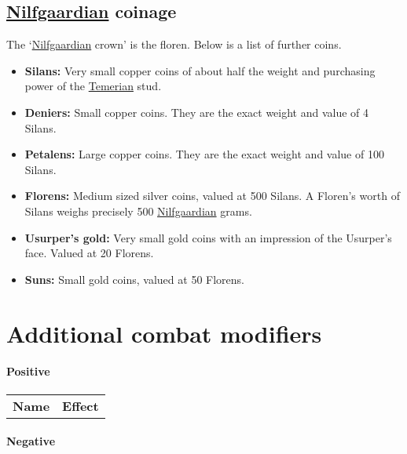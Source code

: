 \documentclass[parskip=full,11pt,%
footheight=38pt]{scrreport}
\begin{document}
\section{\hyperref[realm:nilfgaard]{Nilfgaardian} coinage}
The `\hyperref[realm:nilfgaard]{Nilfgaardian} crown' is the floren. Below is a list of further coins.

\begin{itemize}
	\item \textbf{Silans:} Very small copper coins of about half the weight and purchasing power of the \hyperref[realm:temeria]{Temerian}
	      stud.
	\item \textbf{Deniers:} Small copper coins. They are the exact weight and value of 4 Silans.
	\item \textbf{Petalens:} Large copper coins. They are the exact weight and value of 100 Silans.
	\item \textbf{Florens:} Medium sized silver coins, valued at 500 Silans. A Floren's worth of Silans weighs
	      precisely 500 \hyperref[realm:nilfgaard]{Nilfgaardian} grams.
	\item \textbf{Usurper's gold:} Very small gold coins with an impression of the Usurper's face. Valued at 20 Florens.
	\item \textbf{Suns:} Small gold coins, valued at 50 Florens.
\end{itemize}

\chapter{Additional combat modifiers}

\large

\subsubsection*{Positive}

\begin{tabularx}{\textwidth}{cX}
	\rowcolor{tablebackgroundposhead}
	\textbf{Name} & \textbf{Effect} \\
\end{tabularx}


\subsubsection*{Negative}
\end{document}
